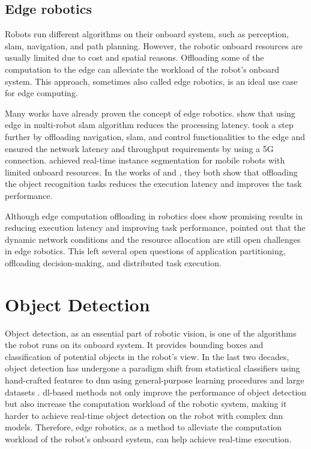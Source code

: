 \subsection{Edge robotics}

Robots run different algorithms on their onboard system, such as perception, \gls{slam}, navigation, and path planning. However, the robotic onboard resources are usually limited due to cost and spatial reasons. Offloading some of the computation to the edge can alleviate the workload of the robot's onboard system. This approach, sometimes also called edge robotics, is an ideal use case for edge computing. 

Many works have already proven the concept of edge robotics. \citeauthor*{Huang2022} \cite{Huang2022} show that using edge in multi-robot \gls{slam} algorithm reduces the processing latency. \citeauthor*{Sossalla2022} \cite{Sossalla2022} took a step further by offloading navigation, \gls{slam}, and control functionalities to the edge and ensured the network latency and throughput requirements by using a 5G connection. \citeauthor*{Xie2021} \cite{Xie2021} achieved real-time instance segmentation for mobile robots with limited onboard resources. In the works of \citeauthor*{Fu2019} \cite{Fu2019} and \citeauthor*{Tanwani} \cite{Tanwani}, they both show that offloading the object recognition tasks reduces the execution latency and improves the task performance. 

Although edge computation offloading in robotics does show promising results in reducing execution latency and improving task performance, \citeauthor{Saeik2021} \cite{Saeik2021} pointed out that the dynamic network conditions and the resource allocation are still open challenges in edge robotics. This left several open questions of application partitioning, offloading decision-making, and distributed task execution. 

\section{Object Detection}\label{sec:object_detection}

Object detection, as an essential part of robotic vision, is one of the algorithms the robot runs on its onboard system. It provides bounding boxes and classification of potential objects in the robot's view. In the last two decades, object detection has undergone a paradigm shift from statistical classifiers using hand-crafted features to \gls{dnn} using general-purpose learning procedures and large datasets \cite{RuizdelSolar2018}. \gls{dl}-based methods not only improve the performance of object detection but also increase the computation workload of the robotic system, making it harder to achieve real-time object detection on the robot with complex \gls{dnn} models. Therefore, edge robotics, as a method to alleviate the computation workload of the robot's onboard system, can help achieve real-time execution. 

